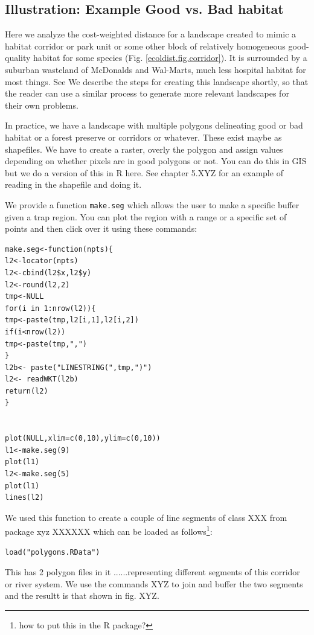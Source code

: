 \subsection{Illustration: Example Good vs. Bad habitat}

Here we analyze the cost-weighted distance for a landscape created to
mimic
a habitat corridor or park unit or some other block of
relatively homogeneous good-quality habitat for some species
(Fig. \ref{ecoldist.fig.corridor}).
It is surrounded by a suburban wasteland of McDonalds and Wal-Marts, much
less hospital habitat for most things. See
We describe the steps for creating this landscape shortly, so that the
reader can use a similar process to generate more relevant landscapes
for their own problems. 

In practice, we have a landscape with multiple polygons delineating
good or bad habitat or a forest preserve or corridors or
whatever. These exist maybe as shapefiles.
We have to create a raster, overly the polygon and assign values
depending on whether pixels are in good polygons or not.
You can do this in GIS but we do a version of this in R here. See
chapter 5.XYZ for an example of reading in the shapefile and doing it.

We provide 
 a function \mbox{\tt make.seg} which allows the user to make a specific
buffer given a trap region.  You can plot the region with a range or a
specific set of points and then click over it using these commands:
{\small 
\begin{verbatim}
make.seg<-function(npts){
l2<-locator(npts)
l2<-cbind(l2$x,l2$y)
l2<-round(l2,2)
tmp<-NULL
for(i in 1:nrow(l2)){
tmp<-paste(tmp,l2[i,1],l2[i,2])
if(i<nrow(l2))
tmp<-paste(tmp,",")
}
l2b<- paste("LINESTRING(",tmp,")")
l2<- readWKT(l2b)
return(l2)
}


plot(NULL,xlim=c(0,10),ylim=c(0,10))
l1<-make.seg(9)
plot(l1)
l2<-make.seg(5)
plot(l1)
lines(l2)
\end{verbatim}
}

We used this function to create a couple of line segments of class XXX
from package xyz XXXXXX  which can be loaded as 
follows\footnote{how to put this in the R package?}:
\begin{verbatim}
load("polygons.RData")
\end{verbatim}
This has 2 polygon files in it ......representing different segments
of this corridor or river system. We use the commands XYZ to join and
buffer the two segments and the resultt is that shown in fig. XYZ.

